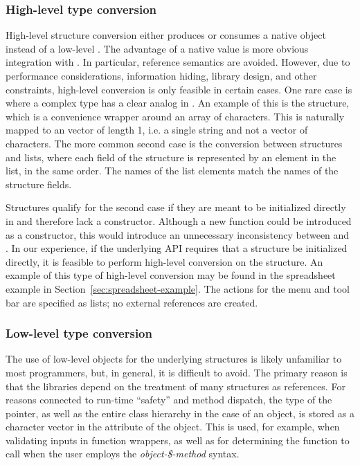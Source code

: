 \documentclass[article,shortnames]{jss}
\begin{document}
\subsubsection{High-level type
conversion}

High-level structure conversion either produces or consumes a native
 object instead of a low-level . The
advantage of a native  value is more obvious integration
with
. In particular, reference semantics are avoided.
However, due to performance considerations, information hiding,
library design, and other constraints, high-level conversion is only
feasible in certain cases.  One rare case is where a complex
 type has a clear analog in .  An example of
this is the  structure, which is a convenience wrapper
around an array of characters. This is naturally mapped to an
  vector of length 1, i.e. a single string
and
not a vector of characters. The more common second case is
the conversion between  structures and  lists,
where each field of the structure is represented by an element in the
list, in the same order. The names of the list elements match the
names of the structure fields.

Structures qualify for the second case if they are meant to be
initialized directly in  and therefore lack a constructor.
Although a new function could be introduced as a constructor, this
would introduce an unnecessary inconsistency between  and
.
In our experience, if the underlying API requires that a structure be
initialized directly, it is feasible to perform high-level conversion
on the structure. An example of this type of high-level conversion may
be found in the spreadsheet example in Section~\ref{sec:spreadsheet-example}. The actions for the menu and tool bar
are specified as lists; no external references are created.

\subsubsection{Low-level type conversion}

The use of low-level  objects for the underlying
 structures is likely unfamiliar to most 
programmers, but, in general, it is difficult to avoid. The primary
reason is that the  libraries depend on the treatment of
many structures as references. For reasons connected to run-time
``safety'' and method dispatch, the type of the pointer, as well as
the entire class hierarchy in the case of an object, is stored as a
character vector in the  attribute of the 
object. 
This is used, for example, when validating inputs in
function wrappers, as well as for determining the function to call
when the user employs the \emph{object-\$-method} syntax.
\end{document}
